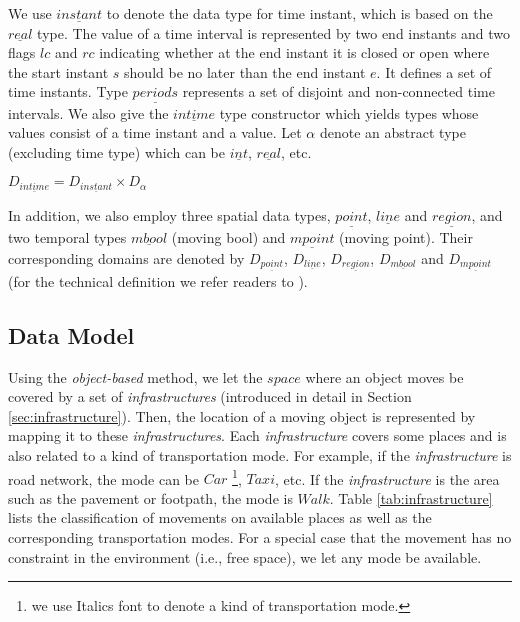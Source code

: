 We use $\underline{instant}$ to denote the data type for time instant, which is based 
on the $\underline{real}$ type. The value of a time interval is represented by two end 
instants and two flags $lc$ and $rc$ indicating whether at the end instant it is closed or open 
where the start instant $s$ should be no later than the end 
instant $e$. It defines a set of time instants. 
Type $\underline{periods}$ represents a set of disjoint and non-connected time intervals. We also
give the $\underline{intime}$ type constructor which yields types whose values consist of a time 
instant and a value. Let $\alpha$ denote an abstract type (excluding time type) which can be $\underline{int}$, $\underline{real}$, etc. 

\begin{Statement}
\label{intime}

$D_{\underline{intime}} = D_{\underline{instant}} \times D_{\alpha}$

\end{Statement}

In addition, we also employ three spatial data types, $\underline{point}$, $\underline{line}$ and $\underline{region}$, and two temporal types $\underline{mbool}$ (moving bool) and 
$\underline{mpoint}$ (moving point). Their 
corresponding domains are denoted by $D_{\underline{point}}$, $D_{\underline{line}}$, $D_{\underline{region}}$, $D_{\underline{mbool}}$ and $D_{\underline{mpoint}}$ 
(for the technical definition we refer readers to \cite{FG+00,GBE+00}). 

\subsection{Data Model}
\label{sec:datamodel}

Using the \textit{object-based} method, we let the $space$ where an object moves be covered by
a set of \textit{infrastructures} (introduced in detail in Section \ref{sec:infrastructure}). 
Then, the location of a moving object is represented by mapping it to these \textit{infrastructures}. 
Each \textit{infrastructure} covers some places and is also related to a kind 
of transportation mode. For example, if the \textit{infrastructure} is road network, the mode 
can be $Car$ \footnote{we use Italics font to denote a kind of transportation mode.}, 
$Taxi$, etc. If the \textit{infrastructure} is the area such as the pavement or footpath, the mode is $Walk$. Table \ref{tab:infrastructure} lists the classification of movements on available places 
as well as the corresponding transportation modes. For a special case that the 
movement has no constraint in the environment (i.e., free space), we let any 
mode be available. 

